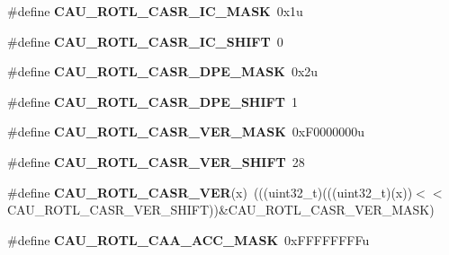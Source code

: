 \begin{DoxyCompactItemize}
\item 
\#define {\bfseries C\+A\+U\+\_\+\+R\+O\+T\+L\+\_\+\+C\+A\+S\+R\+\_\+\+I\+C\+\_\+\+M\+A\+SK}~0x1u\hypertarget{group__CAU__Register__Masks_ga872c60c9f23d4d48a0f47cd1f3848540}{}\label{group__CAU__Register__Masks_ga872c60c9f23d4d48a0f47cd1f3848540}

\item 
\#define {\bfseries C\+A\+U\+\_\+\+R\+O\+T\+L\+\_\+\+C\+A\+S\+R\+\_\+\+I\+C\+\_\+\+S\+H\+I\+FT}~0\hypertarget{group__CAU__Register__Masks_gafe14ff3ce4f7d2b10d0b202cf03546af}{}\label{group__CAU__Register__Masks_gafe14ff3ce4f7d2b10d0b202cf03546af}

\item 
\#define {\bfseries C\+A\+U\+\_\+\+R\+O\+T\+L\+\_\+\+C\+A\+S\+R\+\_\+\+D\+P\+E\+\_\+\+M\+A\+SK}~0x2u\hypertarget{group__CAU__Register__Masks_ga834d584c25afb7faf4c9f0b87b5b9619}{}\label{group__CAU__Register__Masks_ga834d584c25afb7faf4c9f0b87b5b9619}

\item 
\#define {\bfseries C\+A\+U\+\_\+\+R\+O\+T\+L\+\_\+\+C\+A\+S\+R\+\_\+\+D\+P\+E\+\_\+\+S\+H\+I\+FT}~1\hypertarget{group__CAU__Register__Masks_ga4d0da6b7c4575317872d875392fb0272}{}\label{group__CAU__Register__Masks_ga4d0da6b7c4575317872d875392fb0272}

\item 
\#define {\bfseries C\+A\+U\+\_\+\+R\+O\+T\+L\+\_\+\+C\+A\+S\+R\+\_\+\+V\+E\+R\+\_\+\+M\+A\+SK}~0x\+F0000000u\hypertarget{group__CAU__Register__Masks_ga6d8f0ea43478a075cf2a0c9745bd211c}{}\label{group__CAU__Register__Masks_ga6d8f0ea43478a075cf2a0c9745bd211c}

\item 
\#define {\bfseries C\+A\+U\+\_\+\+R\+O\+T\+L\+\_\+\+C\+A\+S\+R\+\_\+\+V\+E\+R\+\_\+\+S\+H\+I\+FT}~28\hypertarget{group__CAU__Register__Masks_gad4f7b9dfa3900a1a24b391b7c515d0e4}{}\label{group__CAU__Register__Masks_gad4f7b9dfa3900a1a24b391b7c515d0e4}

\item 
\#define {\bfseries C\+A\+U\+\_\+\+R\+O\+T\+L\+\_\+\+C\+A\+S\+R\+\_\+\+V\+ER}(x)~(((uint32\+\_\+t)(((uint32\+\_\+t)(x))$<$$<$C\+A\+U\+\_\+\+R\+O\+T\+L\+\_\+\+C\+A\+S\+R\+\_\+\+V\+E\+R\+\_\+\+S\+H\+I\+FT))\&C\+A\+U\+\_\+\+R\+O\+T\+L\+\_\+\+C\+A\+S\+R\+\_\+\+V\+E\+R\+\_\+\+M\+A\+SK)\hypertarget{group__CAU__Register__Masks_ga8dc294f60e158cddfefa8728889a8763}{}\label{group__CAU__Register__Masks_ga8dc294f60e158cddfefa8728889a8763}

\item 
\#define {\bfseries C\+A\+U\+\_\+\+R\+O\+T\+L\+\_\+\+C\+A\+A\+\_\+\+A\+C\+C\+\_\+\+M\+A\+SK}~0x\+F\+F\+F\+F\+F\+F\+F\+Fu\hypertarget{group__CAU__Register__Masks_ga0aa131c13271bf31c8f88c3c7dce8729}{}\label{group__CAU__Register__Masks_ga0aa131c13271bf31c8f88c3c7dce8729}


\end{DoxyCompactItemize}
